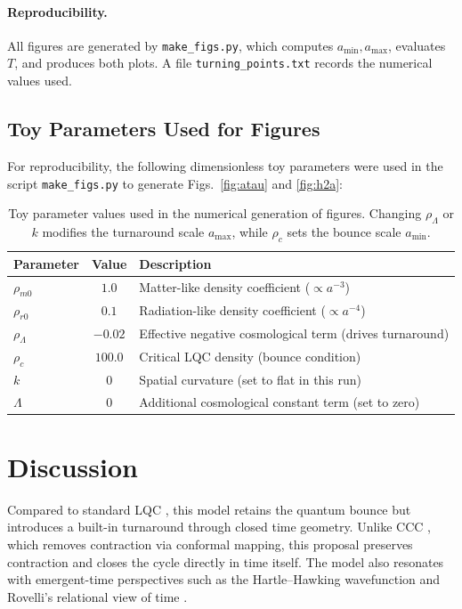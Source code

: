 \documentclass[12pt]{article}
\begin{document}
\paragraph{Reproducibility.} All figures are generated by \texttt{make\_figs.py}, which 
computes $a_{\min},a_{\max}$, evaluates $T$, and produces both plots. 
A file \texttt{turning\_points.txt} records the numerical values used.

\subsection*{Toy Parameters Used for Figures}
For reproducibility, the following dimensionless toy parameters were used in the script 
\texttt{make\_figs.py} to generate Figs.~\ref{fig:atau} and \ref{fig:h2a}:

\begin{table}[h]
\centering
\begin{tabular}{lcl}
\hline
Parameter & Value & Description \\
\hline
$\rho_{m0}$ & $1.0$   & Matter-like density coefficient ($\propto a^{-3}$) \\
$\rho_{r0}$ & $0.1$   & Radiation-like density coefficient ($\propto a^{-4}$) \\
$\rho_{\Lambda}$ & $-0.02$ & Effective negative cosmological term (drives turnaround) \\
$\rho_{c}$ & $100.0$ & Critical LQC density (bounce condition) \\
$k$ & $0$ & Spatial curvature (set to flat in this run) \\
$\Lambda$ & $0$ & Additional cosmological constant term (set to zero) \\
\hline
\end{tabular}
\caption{Toy parameter values used in the numerical generation of figures. 
Changing $\rho_{\Lambda}$ or $k$ modifies the turnaround scale $a_{\max}$, 
while $\rho_{c}$ sets the bounce scale $a_{\min}$.}
\label{tab:params}
\end{table}

\section{Discussion}
Compared to standard LQC \cite{Ashtekar2006}, this model retains the quantum bounce but introduces 
a built-in turnaround through closed time geometry. Unlike CCC \cite{Penrose2010}, which removes 
contraction via conformal mapping, this proposal preserves contraction and closes the cycle 
directly in time itself. The model also resonates with emergent-time perspectives such as the 
Hartle--Hawking wavefunction \cite{Hartle1983} and Rovelli's relational view of time \cite{Rovelli2017}. 
\end{document}
